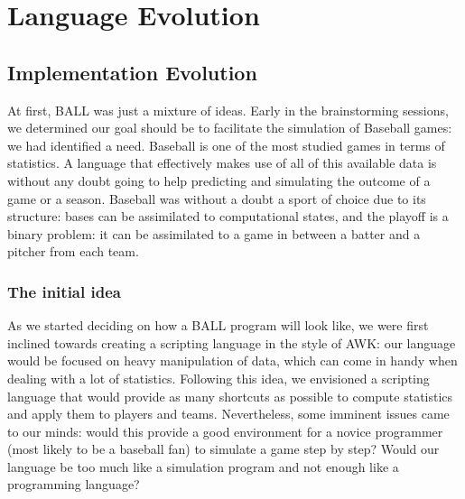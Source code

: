 \chapter{Language Evolution}

\section{Implementation Evolution}

At first, BALL was just a mixture of ideas. Early in the brainstorming
sessions, we determined our goal should be to facilitate the
simulation of Baseball games: we had identified a need. Baseball is
one of the most studied games in terms of statistics. A language that
effectively makes use of all of this available data is without any
doubt going to help predicting and simulating the outcome of a game or
a season. Baseball was without a doubt a sport of choice due to its
structure: bases can be assimilated to computational states, and the
playoff is a binary problem: it can be assimilated to a game in
between a batter and a pitcher from each team.

\subsection{The initial idea}
As we started deciding on how a BALL program will look like, we were
first inclined towards creating a scripting language in the style of
AWK: our language would be focused on heavy manipulation of data,
which can come in handy when dealing with a lot of
statistics. Following this idea, we envisioned a scripting language
that would provide as many shortcuts as possible to compute statistics
and apply them to players and teams. Nevertheless, some imminent
issues came to our minds: would this provide a good environment for a
novice programmer (most likely to be a baseball fan) to simulate a
game step by step? Would our language be too much like a simulation
program and not enough like a programming language?

